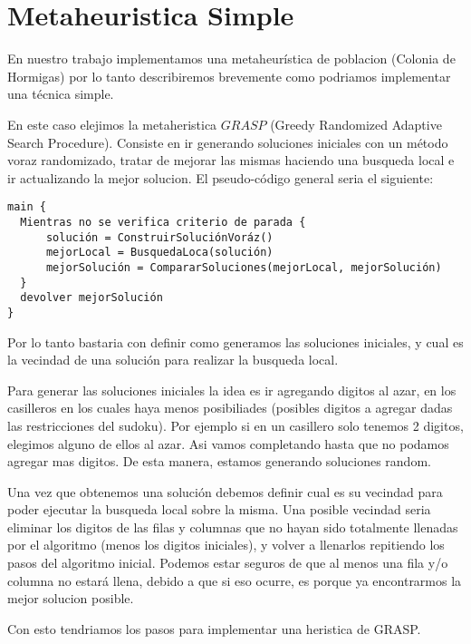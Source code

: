 \section{Metaheuristica Simple}
\label{sec:intro}

En nuestro trabajo implementamos una metaheurística de poblacion (Colonia de Hormigas) 
por lo tanto describiremos brevemente como podriamos implementar una técnica 
simple. 

En este caso elejimos la metaheristica $GRASP$ (Greedy Randomized Adaptive Search 
Procedure). Consiste en ir generando soluciones iniciales con un método voraz 
randomizado, tratar de mejorar las mismas haciendo una busqueda local e ir 
actualizando la mejor solucion. El pseudo-código general seria el siguiente:

\begin{Verbatim}[samepage=true]
main {
  Mientras no se verifica criterio de parada {
      solución = ConstruirSoluciónVoráz()
      mejorLocal = BusquedaLoca(solución)
      mejorSolución = CompararSoluciones(mejorLocal, mejorSolución)
  }
  devolver mejorSolución
}
\end{Verbatim}

Por lo tanto bastaria con definir como generamos las soluciones iniciales, y 
cual es la vecindad de una solución para realizar la busqueda local. 

Para generar las soluciones iniciales la idea es ir agregando digitos al azar, 
en los casilleros en los cuales haya menos posibiliades (posibles digitos a agregar dadas las restricciones del sudoku). 
Por ejemplo si en un casillero solo tenemos 2 digitos, elegimos alguno de ellos al azar. Asi vamos completando
hasta que no podamos agregar mas digitos. De esta manera, estamos generando 
soluciones random.


Una vez que obtenemos una solución debemos definir cual es su vecindad para poder ejecutar la busqueda local
sobre la misma. Una posible vecindad seria eliminar los digitos de las filas y columnas que no hayan sido totalmente
llenadas por el algoritmo (menos los digitos iniciales), y volver a llenarlos 
repitiendo los pasos del algoritmo inicial. 
Podemos estar seguros de que al menos una fila y/o columna no 
estará llena, debido a que si eso ocurre, es porque ya encontrarmos la mejor solucion posible.

Con esto tendriamos los pasos para implementar una heristica de GRASP. 

\newpage
